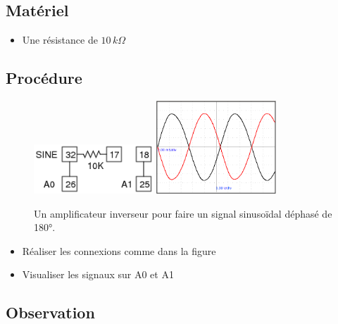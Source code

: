 \documentclass{book}
\begin{document}
\subsection{Matériel}


\begin{itemize}
  \item Une résistance de $10\, k\Omega$
\end{itemize}

\subsection{Procédure}


\begin{figure}[h!]
\begin{center}
\caption{\label{fig:Inverting-Amplifier-making}Un amplificateur inverseur pour faire un signal sinusoïdal déphasé de 180°. }\vspace{0.5em}
\includegraphics[width=0.4\textwidth, height=0.3\textwidth, keepaspectratio]{Schematic-sine-180deg.png}
\includegraphics[width=0.4\textwidth, height=0.3\textwidth, keepaspectratio]{Pic-sine-two-180deg.png}
\end{center}
\end{figure}



\begin{itemize}
  \item Réaliser les connexions comme dans la figure
  \item Visualiser les signaux sur A0 et A1
\end{itemize}

\subsection{Observation}
\end{document}

